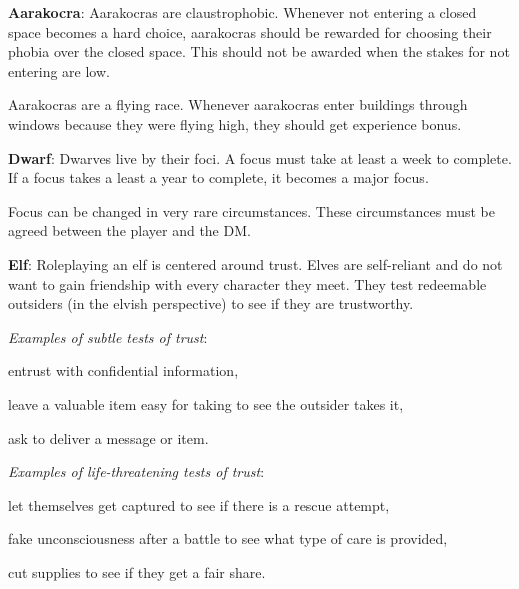 \textbf{Aarakocra}: Aarakocras are claustrophobic. Whenever not entering a closed space becomes a hard choice, aarakocras should be rewarded for choosing their phobia over the closed space. This should not be awarded when the stakes for not entering are low.

Aarakocras are a flying race. Whenever aarakocras enter buildings through windows because they were flying high, they should get experience bonus.


\textbf{Dwarf}: Dwarves live by their foci. A focus must take at least a week to complete. If a focus takes a least a year to complete, it becomes a major focus.

Focus can be changed in very rare circumstances. These circumstances must be agreed between the player and the DM.


\textbf{Elf}: Roleplaying an elf is centered around trust. Elves are self-reliant and do not want to gain friendship with every character they meet. They test redeemable outsiders (in the elvish perspective) to see if they are trustworthy.

\textit{Examples of subtle tests of trust}:
\begin{itemize*}
	\item entrust with confidential information,
	\item leave a valuable item easy for taking to see the outsider takes it,
	\item ask to deliver a message or item.
\end{itemize*}

\textit{Examples of life-threatening tests of trust}:
\begin{itemize*}
	\item let themselves get captured to see if there is a rescue attempt,
	\item fake unconsciousness after a battle to see what type of care is provided,
	\item cut supplies to see if they get a fair share.
\end{itemize*}

